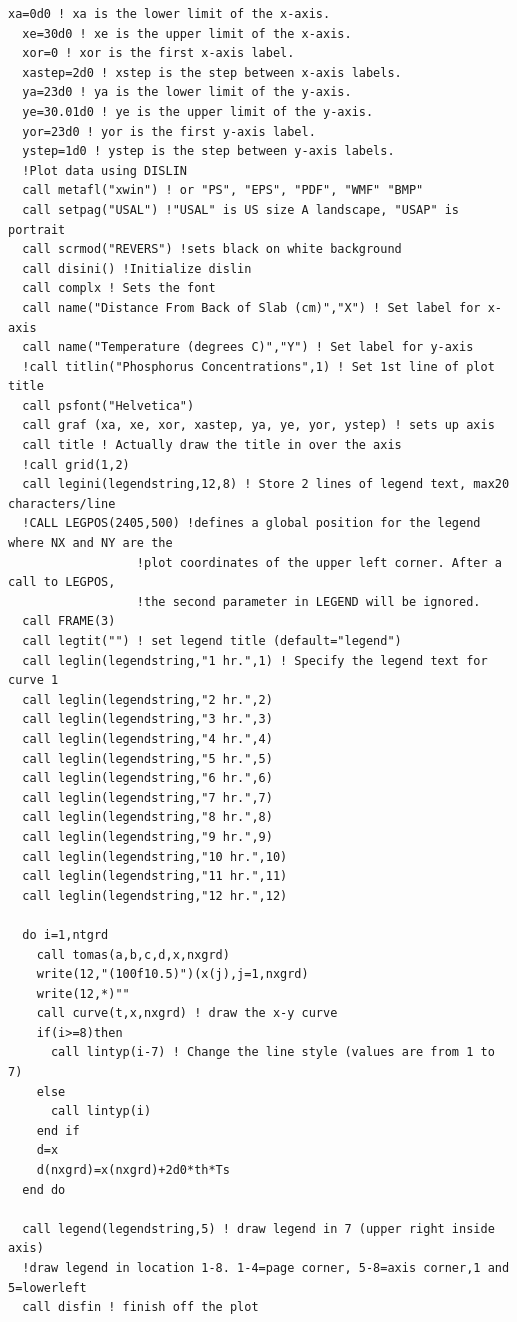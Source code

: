 \documentclass[titlepage,11pt]{article}
\begin{document}
\begin{singlespacing}
\begin{small}
\begin{Verbatim}[frame=single]
  xa=0d0 ! xa is the lower limit of the x-axis.
  xe=30d0 ! xe is the upper limit of the x-axis.
  xor=0 ! xor is the first x-axis label.
  xastep=2d0 ! xstep is the step between x-axis labels.
  ya=23d0 ! ya is the lower limit of the y-axis.
  ye=30.01d0 ! ye is the upper limit of the y-axis.
  yor=23d0 ! yor is the first y-axis label.
  ystep=1d0 ! ystep is the step between y-axis labels.
  !Plot data using DISLIN
  call metafl("xwin") ! or "PS", "EPS", "PDF", "WMF" "BMP"
  call setpag("USAL") !"USAL" is US size A landscape, "USAP" is portrait
  call scrmod("REVERS") !sets black on white background
  call disini() !Initialize dislin
  call complx ! Sets the font
  call name("Distance From Back of Slab (cm)","X") ! Set label for x-axis
  call name("Temperature (degrees C)","Y") ! Set label for y-axis
  !call titlin("Phosphorus Concentrations",1) ! Set 1st line of plot title
  call psfont("Helvetica")
  call graf (xa, xe, xor, xastep, ya, ye, yor, ystep) ! sets up axis
  call title ! Actually draw the title in over the axis
  !call grid(1,2)
  call legini(legendstring,12,8) ! Store 2 lines of legend text, max20 characters/line
  !CALL LEGPOS(2405,500) !defines a global position for the legend where NX and NY are the
                  !plot coordinates of the upper left corner. After a call to LEGPOS,
                  !the second parameter in LEGEND will be ignored.
  call FRAME(3)
  call legtit("") ! set legend title (default="legend")
  call leglin(legendstring,"1 hr.",1) ! Specify the legend text for curve 1
  call leglin(legendstring,"2 hr.",2)
  call leglin(legendstring,"3 hr.",3)
  call leglin(legendstring,"4 hr.",4)
  call leglin(legendstring,"5 hr.",5)
  call leglin(legendstring,"6 hr.",6)
  call leglin(legendstring,"7 hr.",7)
  call leglin(legendstring,"8 hr.",8)
  call leglin(legendstring,"9 hr.",9)
  call leglin(legendstring,"10 hr.",10)
  call leglin(legendstring,"11 hr.",11)
  call leglin(legendstring,"12 hr.",12)

  do i=1,ntgrd
    call tomas(a,b,c,d,x,nxgrd)
    write(12,"(100f10.5)")(x(j),j=1,nxgrd)
    write(12,*)""
    call curve(t,x,nxgrd) ! draw the x-y curve
    if(i>=8)then
      call lintyp(i-7) ! Change the line style (values are from 1 to 7)
    else
      call lintyp(i)
    end if
    d=x
    d(nxgrd)=x(nxgrd)+2d0*th*Ts
  end do

  call legend(legendstring,5) ! draw legend in 7 (upper right inside axis)
  !draw legend in location 1-8. 1-4=page corner, 5-8=axis corner,1 and 5=lowerleft
  call disfin ! finish off the plot


\end{Verbatim}
\end{small}
\end{singlespacing}
\end{document}
